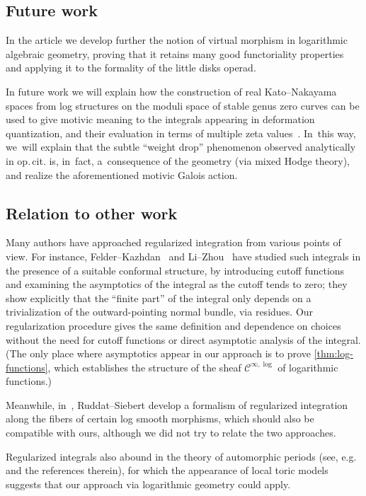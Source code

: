 \documentclass[10pt]{amsart}
\theoremstyle{definition}
\theoremstyle{remark}
\newcommand{\Cinflog}[1]{\mathscr{C}^{\infty,\log}_{#1}}
\providecommand{\eg}{e.g.}\providecommand{\ie}{i.e.}
\begin{document}
\subsection{Future work}

In the article \cite{DPP:WeakMorphisms} we develop further the notion of virtual morphism in logarithmic algebraic geometry, proving that it retains many good functoriality properties and applying it to the formality of the little disks operad.

In future work we will explain how the construction of real Kato--Nakayama spaces from log structures on the moduli space of stable genus zero curves can be used to give motivic meaning to the integrals appearing in deformation quantization, and their evaluation in terms of multiple zeta values~\cite{BPP}. In~this way, we~will explain that the subtle ``weight drop'' phenomenon observed analytically in {op.\,cit.} is, in~fact, a~consequence of the geometry (via mixed Hodge theory), and realize the aforementioned motivic Galois action.

\subsection{Relation to other work}

Many authors have approached regularized integration from various points of view. For instance, Felder--Kazhdan~\cite{Felder2017,Felder2018} and Li--Zhou~\cite{Li2021,Li2023} have studied such integrals in the presence of a suitable conformal structure, by introducing cutoff functions and examining the asymptotics of the integral as the cutoff tends to zero; they show explicitly that the ``finite part'' of the integral only depends on a trivialization of the outward-pointing normal bundle, via residues. Our regularization procedure gives the same definition and dependence on choices without the need for cutoff functions or direct asymptotic analysis of the integral. (The only place where asymptotics appear in our approach is to prove \autoref{thm:log-functions}, which establishes the structure of the sheaf $\Cinflog{}$ of logarithmic functions.)

Meanwhile, in~\cite{RuddatSiebert}, Ruddat--Siebert develop a formalism of regularized integration along the fibers of certain log smooth morphisms, which should also be compatible with ours, although we did not try to relate the two approaches.

Regularized integrals also abound in the theory of automorphic periods (see, \eg \cite{Zydor} and the references therein), for which the appearance of local toric models \cite{Sakellaridis} suggests that our approach via logarithmic geometry could apply.
\end{document}
